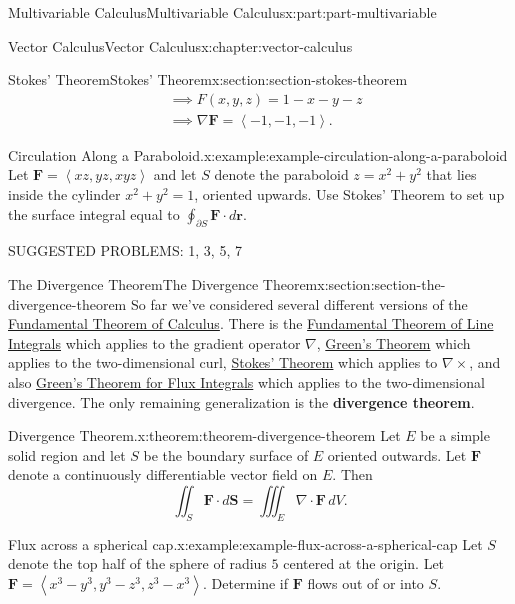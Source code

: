 \documentclass[twoside,10pt,]{tufte-book}
\newcommand{\terminology}[1]{\textbf{#1}}
\numberwithin{equation}{part}
\newcommand{\grad}{\nabla}
\newcommand{\curl}{\nabla\times}
\renewcommand{\div}{\nabla\cdot}
\newcommand{\vb}[1]{\mathbf{#1}}
\newcommand{\dotprod}[1]{\left\langle #1 \right\rangle}
\newcommand{\dr}{\cdot d\vb{r}}
\newcommand{\amp}{&}
\begin{document}
\begin{partptx}{Multivariable Calculus}{}{Multivariable Calculus}{}{}{x:part:part-multivariable}
\begin{chapterptx}{Vector Calculus}{}{Vector Calculus}{}{}{x:chapter:vector-calculus}
\begin{sectionptx}{Stokes' Theorem}{}{Stokes' Theorem}{}{}{x:section:section-stokes-theorem}
\begin{align*}
\amp \implies F(x,y,z) = 1 - x - y - z \\
\amp \implies \grad\vb{F} = \dotprod{-1, -1, -1} \text{.}
\end{align*}
%
\begin{example}{Circulation Along a Paraboloid.}{x:example:example-circulation-along-a-paraboloid}%
Let \(\vb{F} = \dotprod{xz, yz, xyz}\) and let \(S\) denote the paraboloid \(z = x^{2} + y^{2}\) that lies inside the cylinder \(x^{2} + y^{2} = 1\), oriented upwards. Use Stokes' Theorem to set up the surface integral equal to \(\oint_{\partial S}\vb{F}\dr\).%
\end{example}
SUGGESTED PROBLEMS: 1, 3, 5, 7%
\end{sectionptx}
%
%
\typeout{************************************************}
\typeout{************************************************}
%
\begin{sectionptx}{The Divergence Theorem}{}{The Divergence Theorem}{}{}{x:section:section-the-divergence-theorem}
So far we've considered several different versions of the \hyperref[x:theorem:theorem-fundamental-theorem-of-calculus]{Fundamental Theorem of Calculus}. There is the \hyperref[x:theorem:theorem-fundamental-theorem-line-integrals]{Fundamental Theorem of Line Integrals} which applies to the gradient operator \(\grad\), \hyperref[x:theorem:theorem-green-s-theorem]{Green's Theorem} which applies to the two-dimensional curl, \hyperref[x:theorem:theorem-stokes-theorem]{Stokes' Theorem} which applies to \(\curl\), and also \hyperref[x:theorem:theorem-green-s-theorem-for-flux-integrals]{Green's Theorem for Flux Integrals} which applies to the two-dimensional divergence. The only remaining generalization is the \terminology{divergence theorem}.%
\begin{theorem}{Divergence Theorem.}{}{x:theorem:theorem-divergence-theorem}%
Let \(E\) be a simple solid region and let \(S\) be the boundary surface of \(E\) oriented outwards. Let \(\vb{F}\) denote a continuously differentiable vector field on \(E\). Then%
\begin{equation*}
\iint_{S}\vb{F}\cdot d\vb{S} = \iiint_{E}\div\vb{F}\,dV\text{.}
\end{equation*}
%
\end{theorem}
\begin{example}{Flux across a spherical cap.}{x:example:example-flux-across-a-spherical-cap}%
Let \(S\) denote the top half of the sphere of radius \(5\) centered at the origin. Let \(\vb{F} = \dotprod{x^{3} - y^{3}, y^{3} - z^{3}, z^{3} - x^{3}}\). Determine if \(\vb{F}\) flows out of or into \(S\).%

\end{example}
\end{sectionptx}
\end{chapterptx}
\end{partptx}
\end{document}
